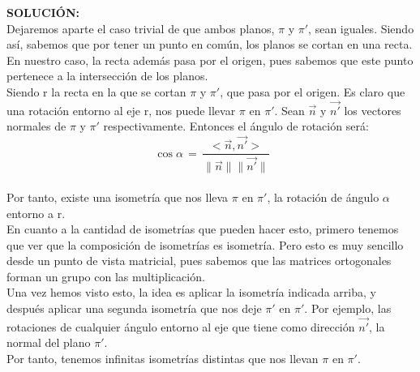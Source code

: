 \documentclass[10pt,a4paper]{article}
\theoremstyle{mystyle}
\begin{document}
\textbf{SOLUCIÓN:}\\

Dejaremos aparte el caso trivial de que ambos planos, $\pi$ y $\pi '$, sean iguales. Siendo así, sabemos que por tener un punto en común, los planos se cortan en una recta. En nuestro caso, la recta además pasa por el origen, pues sabemos que este punto pertenece a la intersección de los planos.\\

Siendo r la recta en la que se cortan $\pi$ y $\pi '$, que pasa por el origen. Es claro que una rotación entorno al eje r, nos puede llevar $\pi$ en $\pi '$. Sean $\vec{n}$ y $\vec{n'}$ los vectores normales de $\pi$ y $\pi '$ respectivamente. Entonces el ángulo de rotación será:\\

\[
\ \cos \alpha \, = \, \dfrac{<\vec{n},\vec{n'}>}{\|\vec{n}\|\|\vec{n'}\|}
\]\\

Por tanto, existe una isometría que nos lleva $\pi$ en $\pi '$, la rotación de ángulo $\alpha$ entorno a r.\\

En cuanto a la cantidad de isometrías que pueden hacer esto, primero tenemos que ver que la composición de isometrías es isometría. Pero esto es muy sencillo desde un punto de vista matricial, pues sabemos que las matrices ortogonales forman un grupo con las multiplicación.\\

Una vez hemos visto esto, la idea es aplicar la isometría indicada arriba, y después aplicar una segunda isometría que nos deje $\pi '$ en $\pi '$. Por ejemplo, las rotaciones de cualquier ángulo entorno al eje que tiene como dirección $\vec{n'}$, la normal del plano $\pi '$.\\

Por tanto, tenemos infinitas isometrías distintas que nos llevan $\pi$ en $\pi '$.\\

\newpage
\nocite{*}


\end{document}
